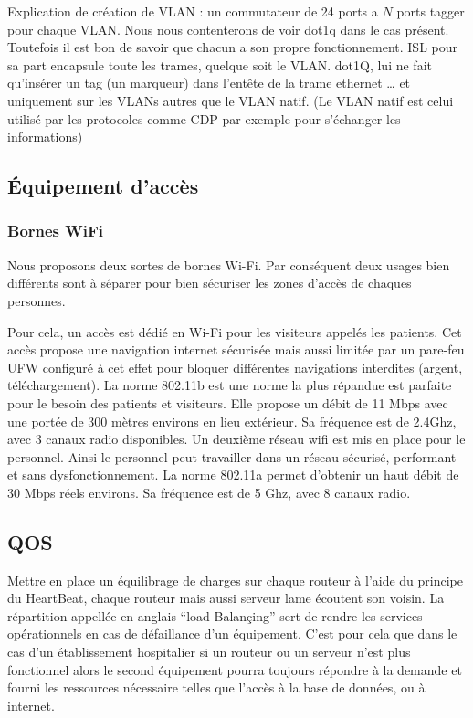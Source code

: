 Explication de création de VLAN :
un commutateur de 24 ports a $N$ ports tagger pour chaque VLAN.
Nous  nous contenterons de voir dot1q dans le cas présent. Toutefois il est bon de savoir que chacun a son propre fonctionnement. ISL pour sa part encapsule toute les trames, quelque soit le VLAN. dot1Q, lui ne fait qu'insérer un tag (un marqueur) dans l'entête de la trame ethernet … et uniquement sur les VLANs autres que le VLAN natif. (Le VLAN natif est celui utilisé par les protocoles comme CDP par exemple pour s'échanger les informations)

%
%
\subsection{Équipement d'accès}

%
\subsubsection{Bornes WiFi}
Nous proposons deux sortes de bornes Wi-Fi. Par conséquent deux usages bien différents sont à séparer pour bien sécuriser les zones d'accès de chaques personnes.

Pour cela, un accès est dédié en Wi-Fi pour les visiteurs appelés les patients. Cet accès propose une navigation internet sécurisée mais aussi limitée par un pare-feu UFW configuré à cet effet pour bloquer différentes navigations interdites (argent, téléchargement). La norme 802.11b est une norme la plus répandue est parfaite pour le besoin des patients et visiteurs. Elle propose un débit de 11 Mbps avec une portée de 300 mètres environs en lieu extérieur. Sa fréquence est de 2.4Ghz, avec 3 canaux radio disponibles.
Un deuxième réseau wifi est mis en place pour le personnel. Ainsi le personnel peut travailler dans un réseau sécurisé, performant et sans dysfonctionnement. La norme 802.11a permet d'obtenir un haut débit de 30 Mbps réels environs. Sa fréquence est de 5 Ghz, avec 8 canaux radio.

%
%
\subsection{QOS}

Mettre en place un équilibrage de charges sur chaque routeur à l'aide du principe du HeartBeat, chaque routeur mais aussi serveur lame écoutent son voisin. La répartition appellée en anglais “load Balançing” sert de rendre les services opérationnels en cas de défaillance d'un équipement. C'est pour cela que dans le cas d'un établissement hospitalier si un routeur ou un serveur n'est plus fonctionnel alors le second équipement pourra toujours répondre à la demande et fourni les ressources nécessaire telles que l'accès à la base de données, ou à internet.
